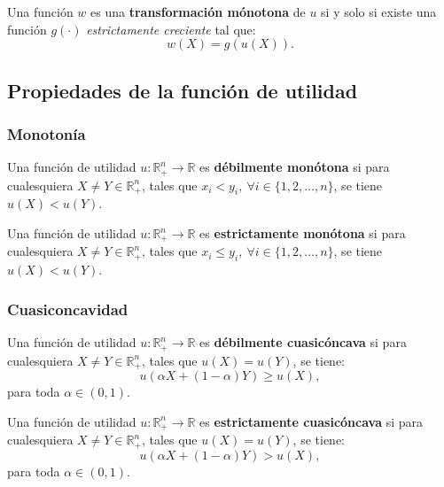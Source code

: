 \documentclass[8pt,a4paper]{extarticle}
\begin{document}
\begin{multicols}{3}
	\begin{boxdef}
		Una función $w$ es una \textbf{transformación mónotona} de $u$ si y solo si existe una función $g(\cdot)$ \emph{estrictamente creciente} tal que:
		\[
			w(X) = g(u(X))
			.\]
	\end{boxdef}

	\sectionbreak

	\subsection{Propiedades de la función de utilidad}

	\subsubsection*{Monotonía}

	\begin{boxdef}
		Una función de utilidad $u : \mathbb{R}^n_+ \to \mathbb{R}$ es \textbf{débilmente monótona} si para cualesquiera $X \neq Y \in \mathbb{R}^n_+$, tales que $x_i < y_i,\ \forall i \in \{1, 2, \ldots, n\}$, se tiene $u(X) < u(Y)$.
	\end{boxdef}

	\begin{boxdef}
		Una función de utilidad $u : \mathbb{R}^n_+ \to \mathbb{R}$ es \textbf{estrictamente monótona} si para cualesquiera $X \neq Y \in \mathbb{R}^n_+$, tales que $x_i \le y_i,\ \forall i \in \{ 1, 2, \ldots, n \}$, se tiene $u(X) < u(Y)$.
	\end{boxdef}

	\subsubsection*{Cuasiconcavidad}

	\begin{boxdef}
		Una función de utilidad $u : \mathbb{R}^n_+ \to \mathbb{R}$ es \textbf{débilmente cuasicóncava} si para cualesquiera $X \neq Y \in \mathbb{R}^n_+$, tales que $u(X) = u(Y)$, se tiene:
		\[
			u(\alpha X + (1 - \alpha)Y) \ge u(X)
			,\]
		para toda $\alpha \in (0, 1)$.
	\end{boxdef}

	\begin{boxdef}
		Una función de utilidad $u : \mathbb{R}^n_+ \to \mathbb{R}$ es \textbf{estrictamente cuasicóncava} si para cualesquiera $X \neq Y \in \mathbb{R}^n_+$, tales que $u(X) = u(Y)$, se tiene:
		\[
			u(\alpha X + (1 - \alpha)Y) > u(X)
			,\]
		para toda $\alpha \in (0, 1)$.
	\end{boxdef}


\end{multicols}
\end{document}
